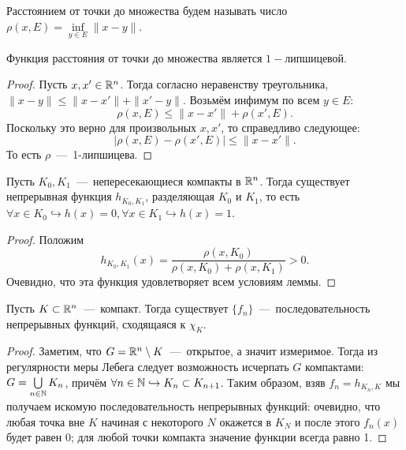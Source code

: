 \begin{reminder}
    Расстоянием от точки до множества будем называть число $\rho(x, E) = \inf\limits_{y \in E} \|x - y\|$.
\end{reminder}

\begin{lemma}
    Функция расстояния от точки до множества является $1-$липшицевой.
\end{lemma}
\begin{proof}
    Пусть $x, x' \in \mathbb{R}^n$. Тогда согласно неравенству треугольника, $\|x - y\| \leq \|x - x'\| + \|x' - y\|$.
    Возьмём инфимум по всем $y \in E:$ \[\rho(x, E) \leq \|x - x'\| + \rho(x', E).\]
    Поскольку это верно для произвольных $x, x'$, то справедливо следующее: \[|\rho(x, E) - \rho(x', E)| \leq \|x - x'\|.\]
    То есть $\rho$~---~1-липшицева.
\end{proof}

\begin{lemma}
    Пусть $K_0, K_1$~---~непересекающиеся компакты в $\mathbb{R}^n$. Тогда существует непрерывная функция $h_{K_0, K_1}$, разделяющая $K_0$ и $K_1$, то есть $\forall x \in K_0 \hookrightarrow h(x) = 0, \forall x \in K_1 \hookrightarrow h(x) = 1$.
\end{lemma}
\begin{proof}
    Положим \[h_{K_0, K_1}(x) = \dfrac{\rho(x, K_0)}{\rho(x, K_0) + \rho(x, K_1)} > 0.\]
    Очевидно, что эта функция удовлетворяет всем условиям леммы.
\end{proof}

\begin{theorem}
    Пусть $K \subset \mathbb{R}^n$~---~компакт. Тогда существует $\{f_n\}$~---~последовательность непрерывных функций, сходящаяся к $\chi_K$.
\end{theorem}
\begin{proof}
    Заметим, что $G = \mathbb{R}^n \setminus K$~---~открытое, а значит измеримое. Тогда из регулярности меры Лебега следует возможность исчерпать $G$ компактами: $G = \bigcup\limits_{n \in \mathbb{N}} K_n$, причём $\forall n \in \mathbb{N} \hookrightarrow K_n \subset K_{n + 1}$. Таким образом, взяв $f_n = h_{K_n, K}$ мы получаем искомую последовательность непрерывных функций: очевидно, что любая точка вне $K$ начиная с некоторого $N$ окажется в $K_N$ и после этого $f_n(x)$ будет равен 0; для любой точки компакта значение функции всегда равно 1.
\end{proof}




